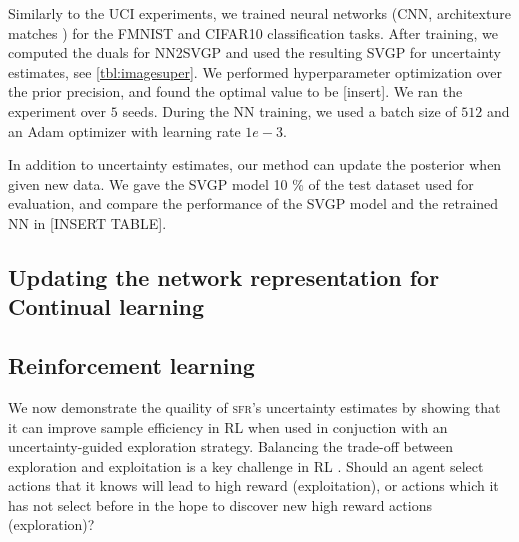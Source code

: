 \documentclass{article}
\newlength{\tblw}
\newcommand{\our}{\textsc{sfr}\xspace}
\begin{document}
Similarly to the UCI experiments, we trained neural networks (CNN, architexture matches \citet{immer2021improving}) for the FMNIST and CIFAR10 classification tasks. After training, we computed the duals for NN2SVGP and used the resulting SVGP for uncertainty estimates, see \cref{tbl:imagesuper}. We performed hyperparameter optimization over the prior precision, and found the optimal value to be [insert]. We ran the experiment over $5$ seeds. During the NN training, we used a batch size of $512$ and an Adam optimizer with learning rate $1e-3$.

In addition to uncertainty estimates, our method can update the posterior when given new data. We gave the SVGP model 10 \% of the test dataset used for evaluation, and compare the performance of the SVGP model and the retrained NN in [INSERT TABLE]. 

\subsection{Updating the  network representation for Continual learning}




\begin{table}[t!] 
  \centering\scriptsize
  \caption{
  TODO: CL Experiments. $^*$ Methods relying only on weight regularization. 
  }
	\label{tbl:cl_table_1}
	\renewcommand{\arraystretch}{1.}
	\setlength{\tabcolsep}{2pt}
	\setlength{\tblw}{0.14\textwidth}  
	
	\newcommand{\val}[2]{%
		$#1$\textcolor{gray}{\tiny ${\pm}#2$}
	} 
	
	
\end{table}


\subsection{Reinforcement learning}
We now demonstrate the quaility of \our's uncertainty estimates by showing that it can improve sample efficiency in RL when used in conjuction with an
uncertainty-guided exploration strategy.
Balancing the trade-off between exploration and exploitation is a key challenge in RL \cite{sutton2018reinforcement}.
Should an agent select actions that it knows will lead to high reward (exploitation), or actions which it has not select before in the
hope to discover new high reward actions (exploration)?
\end{document}
